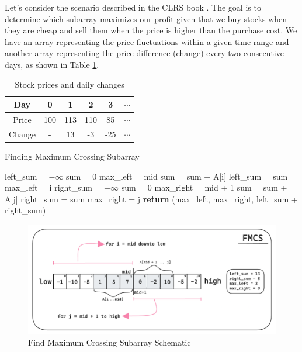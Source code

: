\documentclass[a4paper,10pt]{article}
\begin{document}
Let's consider the scenario described in the CLRS book \cite{10.5555/1614191}. The goal is to determine which subarray maximizes our profit given that we buy stocks when they are cheap and sell them when the price is higher than the purchase cost. We have an array representing the price fluctuations within a given time range and another array representing the price difference (change) every two consecutive days, as shown in Table \ref{tab:stock_prices}.

\begin{table}[h!]
    \centering
    \begin{tabular}{c|c|c|c|c|c}
        \hline
        Day & 0 & 1 & 2 & 3 & $\cdots$\\
        \hline
        Price & 100 & 113 & 110 & 85 & $\cdots$\\
        \hline
        Change & - & 13 & -3 & -25 & $\cdots$\\
        \hline
    \end{tabular}
    \caption{Stock prices and daily changes}
    \label{tab:stock_prices}
\end{table}


\begin{algorithm}
    \caption{Finding Maximum Crossing Subarray}
    \begin{algorithmic}[1]
            \State left\_sum = $-\infty$
            \State sum = 0
            \State max\_left = mid
                \State sum = sum + A[i]
                    \State left\_sum = sum
                    \State max\_left = i
                \EndIf
            \EndFor
            \State right\_sum = $-\infty$
            \State sum = 0
            \State max\_right = mid + 1
                \State sum = sum + A[j]
                    \State right\_sum = sum
                    \State max\_right = j
                \EndIf
            \EndFor
            \State \textbf{return} (max\_left, max\_right, left\_sum + right\_sum)
        \EndFunction
    \end{algorithmic}
    \label{algo:fmcs}
\end{algorithm}

\begin{figure}[ht]
\centering
\includegraphics[width=0.5\linewidth]{figures/fmcs.png}
\caption{Find Maximum Crossing Subarray Schematic}
\label{fig:fmcs}
\end{figure}
\end{document}
